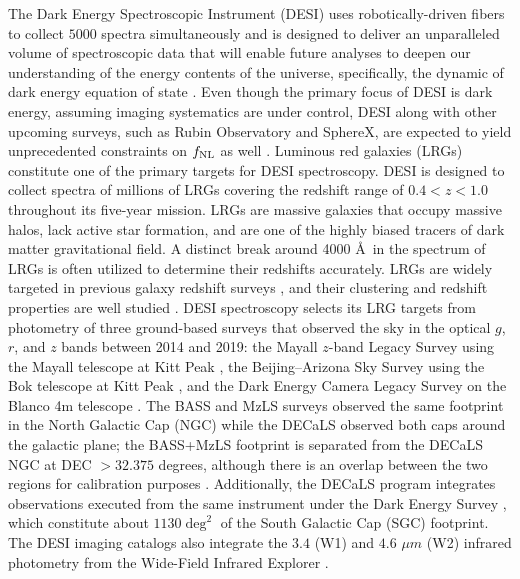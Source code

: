 The Dark Energy Spectroscopic Instrument (DESI) uses robotically-driven fibers to collect $5000$ spectra simultaneously and is designed to deliver an unparalleled volume of spectroscopic data that will enable future analyses to deepen our understanding of the energy contents of the universe, specifically, the dynamic of dark energy equation of state \citep{aghamousa2016desi}. Even though the primary focus of DESI is dark energy, assuming imaging systematics are under control, DESI along with other upcoming surveys, such as Rubin Observatory and SphereX, are expected to yield unprecedented constraints on $f_{\rm NL}$ as well \citep[see, e.g.,][]{Heinrich2022AAS...24020203H}. Luminous red galaxies (LRGs) constitute one of the primary targets for DESI spectroscopy. DESI is designed to collect spectra of millions of LRGs covering the redshift range of $0.4<z<1.0$ throughout its five-year mission. LRGs are massive galaxies that occupy massive halos, lack active star formation, and are one of the highly biased tracers of dark matter gravitational field. A distinct break around 4000 \AA~in the spectrum of LRGs is often utilized to determine their redshifts accurately. LRGs are widely targeted in previous galaxy redshift surveys \citep[see, e.g.,][]{eisenstein2001spectroscopic, prakash2016sdss}, and their clustering and redshift properties are well studied \citep[see, e.g.,][]{ross2020MNRAS.498.2354R, gilmarin2020MNRAS.498.2492G, bautista2021MNRAS.500..736B, chapman2022MNRAS.516..617C}. DESI spectroscopy selects its LRG targets from photometry of three ground-based surveys that observed the sky in the optical $g$, $r$, and $z$ bands between 2014 and 2019: the Mayall $z$-band Legacy Survey using the Mayall telescope at Kitt Peak \citep[MzLS;][]{dey2018overview}, the Beijing–Arizona Sky Survey using the Bok telescope at Kitt Peak \citep[BASS;][]{zou2017project}, and the Dark Energy Camera Legacy Survey on the Blanco 4m telescope \citep[DECaLS][]{flaugher2015dark}. The BASS and MzLS surveys observed the same footprint in the North Galactic Cap (NGC) while the DECaLS observed both caps around the galactic plane; the BASS+MzLS footprint is separated from the DECaLS NGC at DEC $> 32.375$ degrees, although there is an overlap between the two regions for calibration purposes \citep{dey2018overview}. Additionally, the DECaLS program integrates observations executed from the same instrument under the Dark Energy Survey \citep{abbott2016dark}, which constitute about $1130 \deg^{2}$ of the South Galactic Cap (SGC) footprint. The DESI imaging catalogs also integrate the $3.4$ (W1) and $4.6$ $\mu m$ (W2) infrared photometry from the Wide-Field Infrared Explorer \citep[WISE;][]{wise2010AJ....140.1868W, meisner2018RNAAS...2....1M}.  

